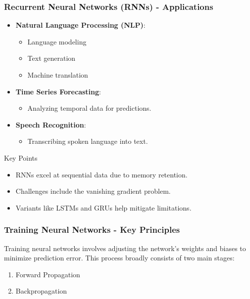\documentclass[aspectratio=169]{beamer}
\begin{document}
\begin{frame}[fragile]
    \frametitle{Recurrent Neural Networks (RNNs) - Applications}
    \begin{itemize}
        \item \textbf{Natural Language Processing (NLP)}:
        \begin{itemize}
            \item Language modeling
            \item Text generation
            \item Machine translation
        \end{itemize}
        \item \textbf{Time Series Forecasting}:
        \begin{itemize}
            \item Analyzing temporal data for predictions.
        \end{itemize}
        \item \textbf{Speech Recognition}:
        \begin{itemize}
            \item Transcribing spoken language into text.
        \end{itemize}
    \end{itemize}
    \begin{block}{Key Points}
        \begin{itemize}
            \item RNNs excel at sequential data due to memory retention.
            \item Challenges include the vanishing gradient problem.
            \item Variants like LSTMs and GRUs help mitigate limitations.
        \end{itemize}
    \end{block}
\end{frame}

\begin{frame}[fragile]
    \frametitle{Training Neural Networks - Key Principles}

    Training neural networks involves adjusting the network’s weights and biases to minimize prediction error. This process broadly consists of two main stages:
    
    \begin{enumerate}
        \item Forward Propagation
        \item Backpropagation
    \end{enumerate}
\end{frame}
\end{document}
